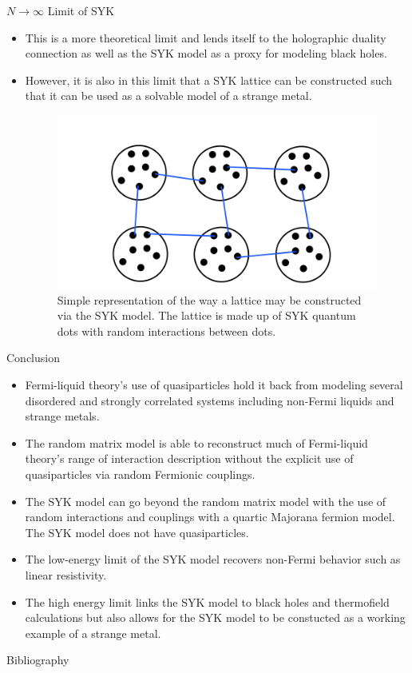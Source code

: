 \documentclass{beamer}
\begin{document}
\begin{frame}{$N \rightarrow \infty$ Limit of SYK }
\begin{itemize}
    \item This is a more theoretical limit and lends itself to the holographic duality connection as well as the SYK model as a proxy for modeling black holes.
    \item However, it is also in this limit that a SYK lattice can be constructed such that it can be used as a solvable model of a strange metal.
    \begin{figure}
        \centering
        \includegraphics[scale = 0.8]{SYKLattice.png}
        \caption{Simple representation of the way a lattice may be constructed via the SYK model. The lattice is made up of SYK quantum dots with random interactions between dots.}
        \label{fig:enter-label}
    \end{figure}
\end{itemize}
\end{frame}
\begin{frame}{Conclusion}
    \begin{itemize}
        \item Fermi-liquid theory's use of quasiparticles hold it back from modeling several disordered and strongly correlated systems including non-Fermi liquids and strange metals.
        \item The random matrix model is able to reconstruct much of Fermi-liquid theory's range of interaction description without the explicit use of quasiparticles via random Fermionic couplings.
        \item The SYK model can go beyond the random matrix model with the use of random interactions and couplings with a quartic Majorana fermion model. The SYK model does not have quasiparticles.
        \item The low-energy limit of the SYK model recovers non-Fermi behavior such as linear resistivity.
        \item The high energy limit links the SYK model to black holes and thermofield calculations but also allows for the SYK model to be constucted as a working example of a strange metal.
    \end{itemize}

\end{frame}





\begin{frame}{Bibliography}


    
\end{frame}
\end{document}
